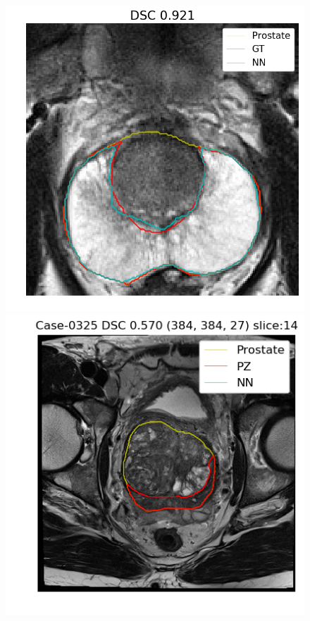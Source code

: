 \begin{figure}[h]
    \includegraphics[totalheight=.2\textheight]{figures/results/PZ_Px_Challenge__P_yes_ROI_MAX_Case-0026.png}
    \vspace{10mm}
    \includegraphics[totalheight=.2\textheight]{figures/results/PZ_Px_Challenge__P_yes_Original_MIN_Case-0325.png}

\end{figure}
